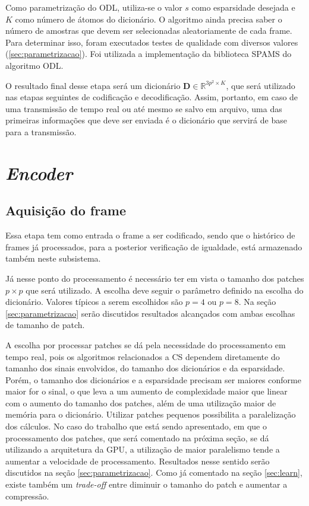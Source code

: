 \documentclass[cic,tc]{iiufrgs}
\newcommand{\mat}[1]{\bm{#1}}
\begin{document}
Como parametrização do ODL, utiliza-se o valor $s$ como esparsidade desejada e
$K$ como número de átomos do dicionário.
O algoritmo ainda precisa saber o número de amostras que devem ser selecionadas aleatoriamente
de cada frame.
Para determinar isso, foram executados testes de qualidade com diversos valores
(\ref{sec:parametrizacao}).
Foi utilizada a implementação da biblioteca SPAMS \cite{SPAMS} do algoritmo ODL.

O resultado final desse etapa será um dicionário $\mat{D} \in \mathbb{R}^{3p^2 \times K}$,
que será utilizado nas etapas seguintes de codificação e decodificação.
Assim, portanto, em caso de uma transmissão de tempo real ou até mesmo se salvo em arquivo,
uma das primeiras informações que deve ser enviada é o dicionário que servirá de base
para a transmissão.


\section{\textit{Encoder}}
\subsection{Aquisição do frame}
\label{sec:frameaquisition}
Essa etapa tem como entrada o frame a ser codificado, sendo que o histórico de frames já
processados, para a posterior verificação de igualdade, está armazenado também neste
subsistema.

Já nesse ponto do processamento é necessário ter em vista o tamanho dos patches $p\times p$
que será utilizado. A escolha deve seguir o parâmetro definido na escolha do dicionário.
Valores típicos a serem escolhidos são $p=4$ ou $p=8$. Na seção \ref{sec:parametrizacao} serão 
discutidos resultados alcançados com ambas escolhas de tamanho de patch.

A escolha por processar patches se dá pela necessidade do processamento em tempo real, pois 
os algoritmos relacionados a CS dependem diretamente do tamanho
dos sinais envolvidos, do tamanho dos dicionários e da esparsidade.
Porém, o tamanho dos dicionários e a esparsidade precisam ser maiores conforme maior for 
o sinal, o que leva a um aumento de complexidade maior que linear com o aumento do tamanho dos
patches, além de uma utilização maior de memória para o dicionário.
Utilizar patches pequenos possibilita a paralelização dos cálculos.
No caso do trabalho que está sendo apresentado, em que o processamento dos patches, que será 
comentado na próxima seção, se dá utilizando a arquitetura da GPU, a utilização de maior 
paralelismo tende a aumentar a velocidade de processamento.
Resultados nesse sentido serão discutidos na seção \ref{sec:parametrizacao}.
Como já comentado na seção \autoref{sec:learn}, existe também um \textit{trade-off} entre 
diminuir o tamanho do patch e aumentar a compressão.
\end{document}
